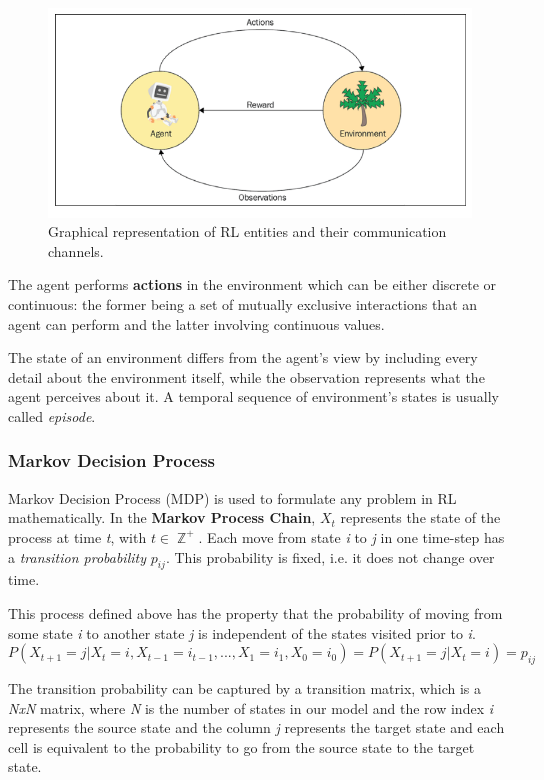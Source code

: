 \documentclass[12pt]{article}
\DeclareMathOperator{\ZX}{\mathbb{Z}}%
\begin{document}
\begin{figure}[H]
        \centerline{\includegraphics[scale=.45]{res/rl.png}}
        \caption{Graphical representation of RL entities and their communication channels.}
\end{figure}

The agent performs \textbf{actions} in the environment which can be either discrete or continuous: the former being a set of mutually exclusive interactions that an agent can perform and the latter involving continuous values. 

The state of an environment differs from the agent's view by including every detail about the environment itself, while the observation represents what the agent perceives about it. A temporal sequence of environment's states is usually called \textit{episode}.

\subsubsection{Markov Decision Process}
Markov Decision Process (MDP) is used to formulate any problem in RL mathematically. In the \textbf{Markov Process Chain},  $X_t$ represents the state of the process at time \textit{t}, with $t \in \ZX^+$. Each move from state \textit{i} to \textit{j} in one time-step has a \textit{transition probability} $p_{ij}$. This probability is fixed, i.e. it does not change over time. 

This process defined above has the property that the probability of moving from some state \textit{i} to another state \textit{j} is independent of the states visited prior to \textit{i}.
            \[ P(X_{t+1} = j|X_t=i, X_{t-1}=i_{t-1},...,X_1=i_1,X_0=i_0) = P(X_{t+1} = j|X_t=i) = p_{ij}\]

The transition probability can be captured by a transition matrix, which is a \textit{NxN} matrix, where \textit{N} is the number of states in our model and the row index \textit{i} represents the source state and the column \textit{j} represents the target state and each cell is equivalent to the probability to go from the source state to the target state.
\end{document}
